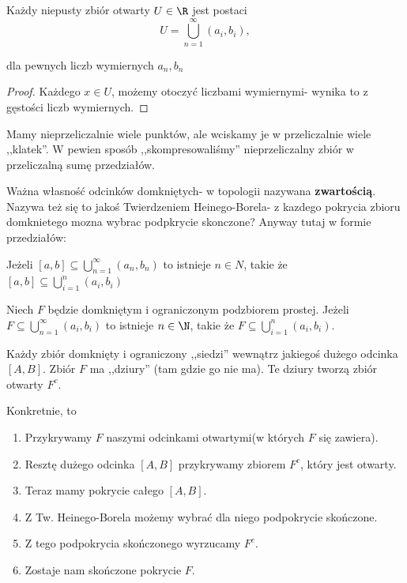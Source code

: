 \begin{theorem}
	Każdy niepusty zbiór otwarty $U\in \R$ jest postaci
	\[
	U = \bigcup_{n=1} ^{\infty}\left( a_{i}, b_{i} \right) 
	,\] 

	dla pewnych liczb wymiernych $a_{n}, b_{n}$
\end{theorem} 
\begin{proof}
	Każdego $x\in U$, możemy otoczyć liczbami wymiernymi- wynika to z gęstości liczb wymiernych.
\end{proof} 
\begin{remark}
	Mamy nieprzeliczalnie wiele punktów, ale wciskamy je w przeliczalnie wiele ,,klatek''. W pewien sposób ,,skompresowaliśmy'' nieprzeliczalny zbiór w przeliczalną sumę przedziałów.
\end{remark} 

Ważna własność odcinków domkniętych- w topologii nazywana \textbf{zwartością}. Nazywa też się to jakoś Twierdzeniem Heinego-Borela- z kazdego pokrycia zbioru domknietego mozna wybrac podpkrycie skonczone? Anyway tutaj w formie przedziałów:
\begin{theorem}
	Jeżeli $[a,b] \subseteq \bigcup_{n=1} ^{\infty}(a_{n}, b_{n}) $ to istnieje $n\in N$, takie że $[a,b] \subseteq \bigcup_{i=1} ^{n}(a_{i},b_{i})$ 
\end{theorem} 
\begin{corollary}
	Niech $F$ będzie domkniętym i ograniczonym podzbiorem prostej. Jeżeli  $F\subseteq \bigcup_{n=1} ^{\infty}(a_{i},b_{i})$ to istnieje $n\in \N$, takie że $F\subseteq \bigcup_{i=1} ^{n}(a_{i},b_{i})$.
\end{corollary}
\begin{intuition}
	Każdy zbiór domknięty i ograniczony ,,siedzi'' wewnątrz jakiegoś dużego odcinka $[A,B].$ Zbiór $F$ ma ,,dziury'' (tam gdzie go nie ma). Te dziury tworzą zbiór otwarty $F^{c}$.

	Konkretnie, to
	\begin{enumerate}[label=\arabic*.]
		\item Przykrywamy $F$ naszymi odcinkami otwartymi(w których $F$ się zawiera).
		\item Resztę dużego odcinka $[A,B]$ przykrywamy zbiorem  $F^{c}$, który jest otwarty.
		\item Teraz mamy pokrycie całego $[A,B]$.
		\item Z Tw. Heinego-Borela możemy wybrać dla niego podpokrycie skończone.
		\item  Z tego podpokrycia skończonego wyrzucamy $F^{c}$.
		\item Zostaje nam skończone pokrycie $F$.
	\end{enumerate}
\end{intuition} 

